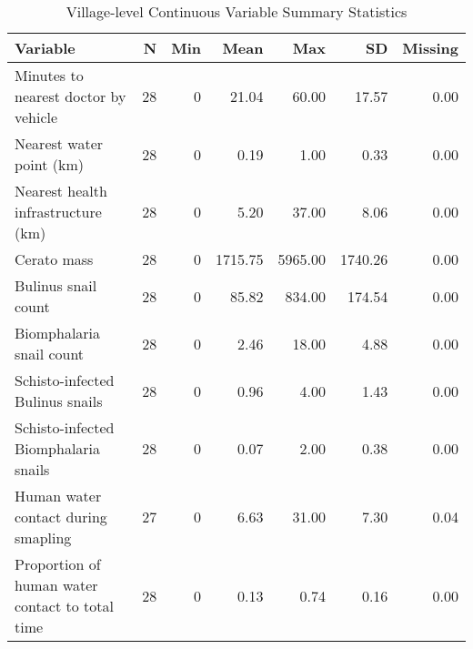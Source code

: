 \begin{table}[!t]
\caption*{
{\large Village-level Continuous Variable Summary Statistics}
} 
\fontsize{12.0pt}{14.4pt}\selectfont
\begin{tabular*}{\linewidth}{@{\extracolsep{\fill}}lrrrrrr}
\toprule
Variable & N & Min & Mean & Max & SD & Missing \\ 
\midrule\addlinespace[2.5pt]
Minutes to nearest doctor by vehicle & 28 & 0 & 21.04 & 60.00 & 17.57 & 0.00 \\ 
Nearest water point (km) & 28 & 0 & 0.19 & 1.00 & 0.33 & 0.00 \\ 
Nearest health infrastructure (km) & 28 & 0 & 5.20 & 37.00 & 8.06 & 0.00 \\ 
Cerato mass & 28 & 0 & 1715.75 & 5965.00 & 1740.26 & 0.00 \\ 
Bulinus snail count & 28 & 0 & 85.82 & 834.00 & 174.54 & 0.00 \\ 
Biomphalaria snail count & 28 & 0 & 2.46 & 18.00 & 4.88 & 0.00 \\ 
Schisto-infected Bulinus snails & 28 & 0 & 0.96 & 4.00 & 1.43 & 0.00 \\ 
Schisto-infected Biomphalaria snails & 28 & 0 & 0.07 & 2.00 & 0.38 & 0.00 \\ 
Human water contact during smapling & 27 & 0 & 6.63 & 31.00 & 7.30 & 0.04 \\ 
Proportion of human water contact to total time & 28 & 0 & 0.13 & 0.74 & 0.16 & 0.00 \\ 
\bottomrule
\end{tabular*}
\end{table}

